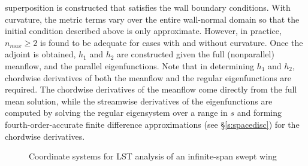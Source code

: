 superposition is constructed that satisfies the wall boundary conditions.
With curvature, the metric terms vary over the entire wall-normal domain so
that the initial condition described above is only approximate.  However, in
practice, $n_{max} \ge 2$ is found to be adequate for cases with and without
curvature.  Once the adjoint is obtained, $h_1$ and $h_2$ are constructed
given the full (nonparallel) meanflow, and the parallel eigenfunctions.  Note
that in determining $h_1$ and $h_2$, chordwise derivatives of both the
meanflow and the regular eigenfunctions are required.  The chordwise
derivatives of the meanflow come directly from the full mean solution, while
the streamwise derivatives of the eigenfunctions are computed by solving the
regular eigensystem over a range in $s$ and forming fourth-order-accurate
finite difference approximations (see \S\ref{s:spacedisc}) for the chordwise
derivatives.

%
%
%
\begin{figure}[p]
\centering \epsfxsize=5.0in 
\caption {Coordinate systems for LST analysis of an infinite-span swept
wing\label{f:LSTcoord}}
\end{figure}
